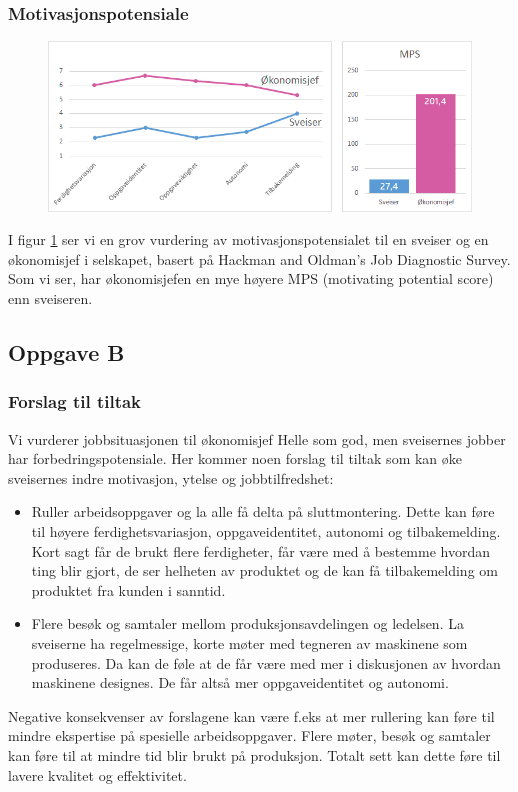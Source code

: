 \subsubsection{Motivasjonspotensiale}
\begin{figure}[ht!]
    \centering
    \includegraphics[width=135mm]{mps.png}
    \label{fig:mps}
\end{figure}
I figur \ref{fig:mps} ser vi en grov vurdering av motivasjonspotensialet til en sveiser og en økonomisjef i selskapet, basert på Hackman and Oldman’s Job Diagnostic Survey. Som vi ser, har økonomisjefen en mye høyere MPS (motivating potential score) enn sveiseren.


\subsection{Oppgave B}
\subsubsection{Forslag til tiltak}
Vi vurderer jobbsituasjonen til økonomisjef Helle som god, men sveisernes jobber har forbedringspotensiale. Her kommer noen forslag til tiltak som kan øke sveisernes indre motivasjon, ytelse og jobbtilfredshet:

\begin{itemize}
  \item Ruller arbeidsoppgaver og la alle få delta på sluttmontering. Dette kan føre til høyere ferdighetsvariasjon, oppgaveidentitet, autonomi og tilbakemelding. Kort sagt får de brukt flere ferdigheter, får være med å bestemme hvordan ting blir gjort, de ser helheten av produktet og de kan få tilbakemelding om produktet fra kunden i sanntid.
  \item Flere besøk og samtaler mellom produksjonsavdelingen og ledelsen. La sveiserne ha regelmessige, korte møter med tegneren av maskinene som produseres. Da kan de føle at de får være med mer i diskusjonen av hvordan maskinene designes. De får altså mer oppgaveidentitet og autonomi.
\end{itemize}

Negative konsekvenser av forslagene kan være f.eks at mer rullering kan føre til mindre ekspertise på spesielle arbeidsoppgaver. Flere møter, besøk og samtaler kan føre til at mindre tid blir brukt på produksjon. Totalt sett kan dette føre til lavere kvalitet og effektivitet.
